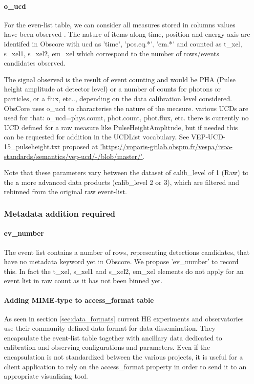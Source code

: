 \documentclass[11pt,a4paper]{ivoa}
\begin{document}
\paragraph{o\_ucd}
For the even-list table, we can consider all measures stored in columns values have been observed .
The nature of items along time, position and energy axis are identifed in Obscore with ucd as 'time', 'pos.eq.*', 'em.*'
and counted as t\_xel, s\_xel1, s\_xel2, em\_xel which correspond to the number of rows/events candidates observed.

The signal observed is the result of event counting and would be PHA (Pulse height amplitude at detector level) or a number of counts for photons or particles, or a flux, etc.., depending on the data calibration level considered.
ObsCore uses o\_ucd to characterise the nature of the measure.
various UCDs are used for that: o\_ucd=phys.count, phot.count, phot.flux, etc. there is currently no UCD defined for a raw measure like PulseHeightAmplitude, but if needed this can be requested for addition in the UCDList vocabulary. See VEP-UCD-15\_pulseheight.txt proposed at \url{'https://voparis-gitlab.obspm.fr/vespa/ivoa-standards/semantics/vep-ucd/-/blob/master/'}.

Note that these parameters vary between the dataset of calib\_level of 1 (Raw) to the a more advanced data products (calib\_level 2 or 3), which are filtered and rebinned from the original raw event-list.


\subsubsection{Metadata addition required}

\paragraph{ev\_number}
The event list contains a number of rows, representing detections candidates, that have no metadata keyword yet in Obscore.
We propose 'ev\_number' to record this.
In fact the t\_xel, s\_xel1 and s\_xel2, em\_xel elements do not apply for an event list in raw count as it has not been binned yet.

\paragraph{Adding MIME-type to access\_format table}
As seen in section \ref{sec:data_formats} current HE experiments and observatories use their community defined data format for data dissemination.
They encapsulate the event-list table together with ancillary data dedicated to calibration and observing configurations and parameters.
Even if the encapsulation is not standardized between the various projects, it is useful for a client application to rely on the access\_format property in order to send it to an appropriate visualizing tool.
\end{document}
